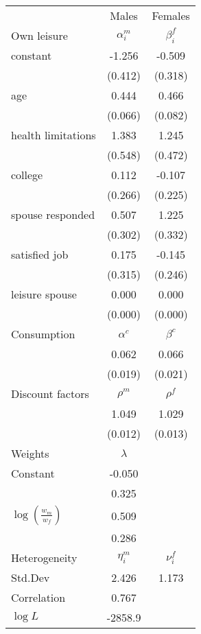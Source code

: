\begin{tabular}{lcc} 
\hline\hline 
 & Males & Females \\ 
Own leisure & $\alpha_{i}^{m}$ & $\beta_{i}^{f}$ \\ 
constant & -1.256 & -0.509 \\ 
 & (0.412) & (0.318) \\ 
age & 0.444 & 0.466 \\ 
 & (0.066) & (0.082) \\ 
health limitations & 1.383 & 1.245 \\ 
 & (0.548) & (0.472) \\ 
college & 0.112 & -0.107 \\ 
 & (0.266) & (0.225) \\ 
spouse responded & 0.507 & 1.225 \\ 
 & (0.302) & (0.332) \\ 
satisfied job & 0.175 & -0.145 \\ 
 & (0.315) & (0.246) \\ 
leisure spouse & 0.000 & 0.000 \\ 
 & (0.000) & (0.000) \\ 
Consumption & $\alpha^{c}$ & $\beta^{c}$ \\ 
 & 0.062 & 0.066 \\ 
 & (0.019) & (0.021) \\ 
Discount factors & $\rho^m$ & $\rho^f$ \\ 
 & 1.049 & 1.029 \\ 
 & (0.012) & (0.013) \\ 
Weights & $\lambda$ &  \\ 
Constant & -0.050 &  \\ 
 & 0.325 &  \\ 
$\log(\frac{w_m}{w_f})$ & 0.509 &  \\ 
 & 0.286 &  \\ 
Heterogeneity & $\eta_i^m$ & $\nu_i^f$ \\ 
Std.Dev & 2.426 & 1.173 \\ 
Correlation & 0.767 &  \\ 
\hline 
$\log L$ & -2858.9 & \\ 
\hline \hline 
\end{tabular} 
